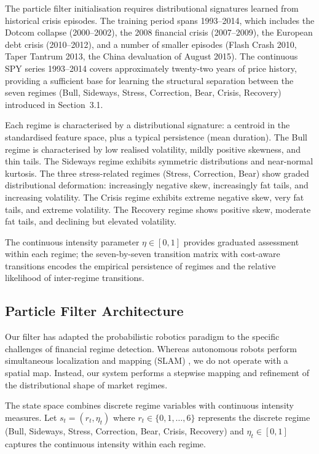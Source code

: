 \documentclass[11pt]{article}
\begin{document}
The particle filter initialisation requires distributional signatures
learned from historical crisis episodes. The training period spans
1993--2014, which includes the Dotcom collapse (2000--2002), the 2008
financial crisis (2007--2009), the European debt crisis (2010--2012),
and a number of smaller episodes (Flash Crash 2010, Taper Tantrum 2013,
the China devaluation of August 2015). The continuous SPY series
1993--2014 covers approximately twenty-two years of price history,
providing a sufficient base for learning the structural separation
between the seven regimes (Bull, Sideways, Stress, Correction, Bear,
Crisis, Recovery) introduced in Section~3.1.

Each regime is characterised by a distributional signature: a centroid
in the standardised feature space, plus a typical persistence (mean
duration). The Bull regime is characterised by low realised volatility,
mildly positive skewness, and thin tails. The Sideways regime exhibits
symmetric distributions and near-normal kurtosis. The three
stress-related regimes (Stress, Correction, Bear) show graded
distributional deformation: increasingly negative skew, increasingly fat
tails, and increasing volatility. The Crisis regime exhibits extreme
negative skew, very fat tails, and extreme volatility. The Recovery
regime shows positive skew, moderate fat tails, and declining but
elevated volatility.

The continuous intensity parameter $\eta \in [0,1]$ provides graduated
assessment within each regime; the seven-by-seven transition matrix with
cost-aware transitions encodes the empirical persistence of regimes and
the relative likelihood of inter-regime transitions.

\subsection{Particle Filter Architecture}
\label{sec:pf}

Our filter has adapted the probabilistic robotics paradigm to the
specific challenges of financial regime detection. Whereas autonomous
robots perform simultaneous localization and mapping (SLAM)
\citep{Thrun2005}, we do not operate with a spatial map. Instead, our
system performs a stepwise mapping and refinement of the distributional
shape of market regimes.

The state space combines discrete regime variables with continuous
intensity measures. Let $s_t = (r_t, \eta_t)$ where
$r_t \in \{0,1,\ldots,6\}$ represents the discrete regime (Bull,
Sideways, Stress, Correction, Bear, Crisis, Recovery) and
$\eta_t \in [0,1]$ captures the continuous intensity within each regime.
\end{document}
